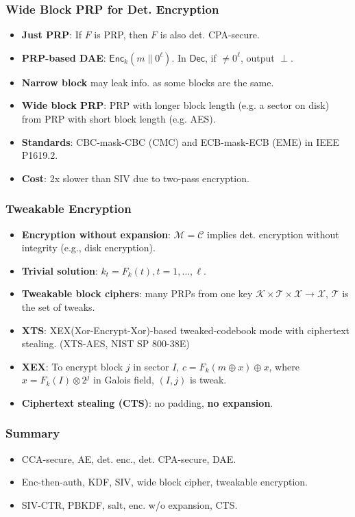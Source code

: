 \begin{frame}\frametitle{Wide Block PRP for Det. Encryption}
\begin{itemize}
\item \textbf{Just PRP}: If $F$ is PRP, then $F$ is also det. CPA-secure.
\item \textbf{PRP-based DAE}: $\mathsf{Enc}_k(m\| 0^{\ell})$. In $\mathsf{Dec}$, if $\neq 0^{\ell}$, output $\perp$.
\item \textbf{Narrow block} may leak info. as some blocks are the same.
\item \textbf{Wide block PRP}: PRP with longer block length (e.g. a sector on disk) from PRP with short block length (e.g. AES).
\item \textbf{Standards}: CBC-mask-CBC (CMC) and ECB-mask-ECB (EME) in IEEE P1619.2.
\item \textbf{Cost}: 2x slower than SIV due to two-pass encryption.
\end{itemize}
\end{frame}
\begin{frame}\frametitle{Tweakable Encryption}
\begin{itemize}
\item \textbf{Encryption without expansion}: $\mathcal{M} = \mathcal{C}$ implies det. encryption without integrity (e.g., disk encryption).
\item \textbf{Trivial solution}: $k_t = F_k(t), t=1,\dots,\ell.$
\item \textbf{Tweakable block ciphers}: many PRPs from one key $\mathcal{K} \times \mathcal{T} \times \mathcal{X} \to \mathcal{X}$, $\mathcal{T}$ is the set of tweaks.
\item \textbf{XTS}: XEX(Xor-Encrypt-Xor)-based tweaked-codebook mode with ciphertext stealing. (XTS-AES, NIST SP 800-38E)
\item \textbf{XEX}: To encrypt block $j$ in sector $I$, $c = F_k(m\oplus x)\oplus x$, where $x=F_k(I)\otimes 2^j$ in Galois field, $(I,j)$ is tweak.
\item \textbf{Ciphertext stealing (CTS)}: no padding, \textbf{no expansion}.
\begin{figure}
\begin{center}

\end{center}
\end{figure}
\end{itemize}
\end{frame}
\begin{frame}\frametitle{Summary}
\begin{itemize}
\item CCA-secure, AE, det. enc., det. CPA-secure, DAE.
\item Enc-then-auth, KDF, SIV, wide block cipher, tweakable encryption.
\item SIV-CTR, PBKDF, salt, enc. w/o expansion, CTS.
\end{itemize}
\end{frame}
